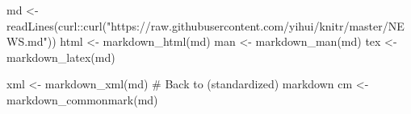 md <- readLines(curl::curl("https://raw.githubusercontent.com/yihui/knitr/master/NEWS.md"))
html <- markdown_html(md)
man <- markdown_man(md)
tex <- markdown_latex(md)

xml <- markdown_xml(md)
# Back to (standardized) markdown
cm <- markdown_commonmark(md)

